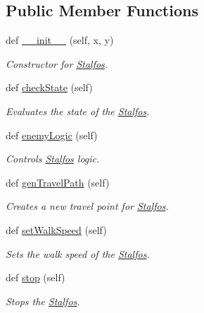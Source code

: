 \subsection*{Public Member Functions}
\begin{DoxyCompactItemize}
\item 
def \hyperlink{classactor_1_1stalfos_1_1_stalfos_ad8c4e62f51605d1b83c80e21263334af}{\+\_\+\+\_\+init\+\_\+\+\_\+} (self, x, y)
\begin{DoxyCompactList}\small\item\em Constructor for \hyperlink{classactor_1_1stalfos_1_1_stalfos}{Stalfos}. \end{DoxyCompactList}\item 
def \hyperlink{classactor_1_1stalfos_1_1_stalfos_adea3ec3198efffc7015efb4b49a44a69}{check\+State} (self)
\begin{DoxyCompactList}\small\item\em Evaluates the state of the \hyperlink{classactor_1_1stalfos_1_1_stalfos}{Stalfos}. \end{DoxyCompactList}\item 
def \hyperlink{classactor_1_1stalfos_1_1_stalfos_a1789c1afbf23d5983dec9432578fd058}{enemy\+Logic} (self)
\begin{DoxyCompactList}\small\item\em Controls \hyperlink{classactor_1_1stalfos_1_1_stalfos}{Stalfos} logic. \end{DoxyCompactList}\item 
def \hyperlink{classactor_1_1stalfos_1_1_stalfos_aba32f6c73afde82b410eee05e86c6545}{gen\+Travel\+Path} (self)
\begin{DoxyCompactList}\small\item\em Creates a new travel point for \hyperlink{classactor_1_1stalfos_1_1_stalfos}{Stalfos}. \end{DoxyCompactList}\item 
def \hyperlink{classactor_1_1stalfos_1_1_stalfos_ac3fe6cc13509504318f492473795dc41}{set\+Walk\+Speed} (self)
\begin{DoxyCompactList}\small\item\em Sets the walk speed of the \hyperlink{classactor_1_1stalfos_1_1_stalfos}{Stalfos}. \end{DoxyCompactList}\item 
def \hyperlink{classactor_1_1stalfos_1_1_stalfos_abb5c74f32bbfa0a9d7d4bfaa60b6f2d7}{stop} (self)
\begin{DoxyCompactList}\small\item\em Stops the \hyperlink{classactor_1_1stalfos_1_1_stalfos}{Stalfos}. \end{DoxyCompactList}\end{DoxyCompactItemize}

